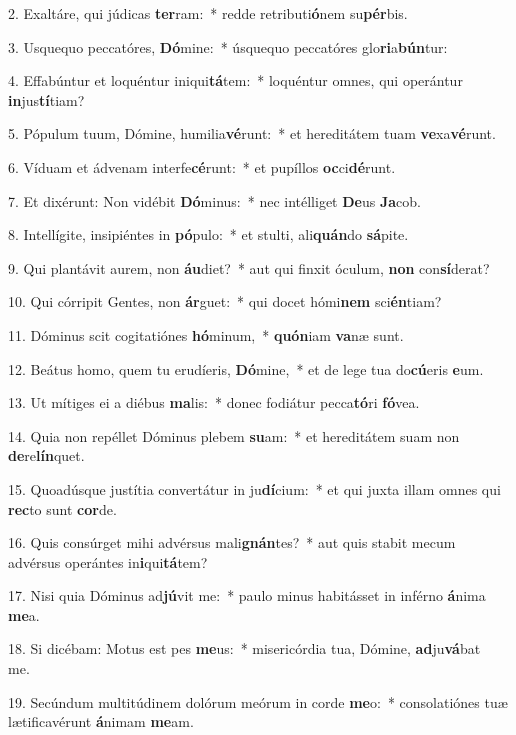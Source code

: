 2. Exaltáre, qui júdicas \textbf{ter}ram:~*  redde retributi\textbf{ó}nem su\textbf{pér}bis.\

3. Usquequo peccatóres, \textbf{Dó}mine:~*  úsquequo peccatóres glo\textbf{ri}a\textbf{bún}tur:\

4. Effabúntur et loquéntur iniqui\textbf{tá}tem:~*  loquéntur omnes, qui operántur \textbf{in}jus\textbf{tí}tiam?\

5. Pópulum tuum, Dómine, humilia\textbf{vé}runt:~*  et hereditátem tuam \textbf{ve}xa\textbf{vé}runt.\

6. Víduam et ádvenam interfe\textbf{cé}runt:~*  et pupíllos \textbf{oc}ci\textbf{dé}runt.\

7. Et dixérunt: Non vidébit \textbf{Dó}minus:~*  nec intélliget \textbf{De}us \textbf{Ja}cob.\

8. Intellígite, insipiéntes in \textbf{pó}pulo:~*  et stulti, ali\textbf{quán}do \textbf{sá}pite.\

9. Qui plantávit aurem, non \textbf{áu}diet?~*  aut qui finxit óculum, \textbf{non} con\textbf{sí}derat?\

10. Qui córripit Gentes, non \textbf{ár}guet:~*  qui docet hómi\textbf{nem} sci\textbf{én}tiam?\

11. Dóminus scit cogitatiónes \textbf{hó}minum,~*  \textbf{quón}iam \textbf{va}næ sunt.\

12. Beátus homo, quem tu erudíeris, \textbf{Dó}mine,~*  et de lege tua do\textbf{cú}eris \textbf{e}um.\

13. Ut mítiges ei a diébus \textbf{ma}lis:~*  donec fodiátur pecca\textbf{tó}ri \textbf{fó}vea.\

14. Quia non repéllet Dóminus plebem \textbf{su}am:~*  et hereditátem suam non \textbf{de}re\textbf{lín}quet.\

15. Quoadúsque justítia convertátur in ju\textbf{dí}cium:~*  et qui juxta illam omnes qui \textbf{rec}to sunt \textbf{cor}de.\

16. Quis consúrget mihi advérsus mali\textbf{gnán}tes?~*  aut quis stabit mecum advérsus operántes in\textbf{i}qui\textbf{tá}tem?\

17. Nisi quia Dóminus ad\textbf{jú}vit me:~*  paulo minus habitásset in inférno \textbf{á}nima \textbf{me}a.\

18. Si dicébam: Motus est pes \textbf{me}us:~*  misericórdia tua, Dómine, \textbf{ad}ju\textbf{vá}bat me.\

19. Secúndum multitúdinem dolórum meórum in corde \textbf{me}o:~*  consolatiónes tuæ lætificavérunt \textbf{á}nimam \textbf{me}am.\

